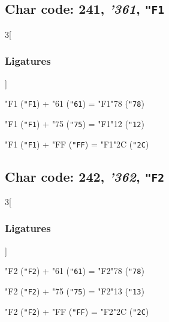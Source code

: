 \documentclass{article}
\newlength{\maxcharwidth}
\begin{document}
\subsection{Char code: 241, {\it'361}, {\tt"F1}}
\label{char_241}


\begin{multicols}{3}[\subsubsection{Ligatures}]

{\testfont\char"F1\noboundary} ({\tt"F1}) + {\testfont\char"61\noboundary} ({\tt"61}) = {\testfont\char"F1\noboundary}{\testfont\char"78\noboundary} ({\tt"78}) 

{\testfont\char"F1\noboundary} ({\tt"F1}) + {\testfont\char"75\noboundary} ({\tt"75}) = {\testfont\char"F1\noboundary}{\testfont\char"12\noboundary} ({\tt"12}) 

{\testfont\char"F1\noboundary} ({\tt"F1}) + {\testfont\char"FF\noboundary} ({\tt"FF}) = {\testfont\char"F1\noboundary}{\testfont\char"2C\noboundary} ({\tt"2C}) 

\end{multicols}

\subsection{Char code: 242, {\it'362}, {\tt"F2}}
\label{char_242}


\begin{multicols}{3}[\subsubsection{Ligatures}]

{\testfont\char"F2\noboundary} ({\tt"F2}) + {\testfont\char"61\noboundary} ({\tt"61}) = {\testfont\char"F2\noboundary}{\testfont\char"78\noboundary} ({\tt"78}) 

{\testfont\char"F2\noboundary} ({\tt"F2}) + {\testfont\char"75\noboundary} ({\tt"75}) = {\testfont\char"F2\noboundary}{\testfont\char"13\noboundary} ({\tt"13}) 

{\testfont\char"F2\noboundary} ({\tt"F2}) + {\testfont\char"FF\noboundary} ({\tt"FF}) = {\testfont\char"F2\noboundary}{\testfont\char"2C\noboundary} ({\tt"2C}) 

\end{multicols}
\end{document}
